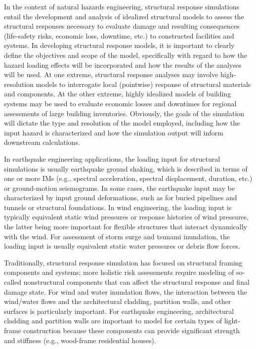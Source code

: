 In the context of natural hazards engineering, structural response simulations entail the development and analysis of idealized structural models to assess the structural responses necessary to evaluate damage and resulting consequences (life-safety risks, economic loss, downtime, etc.) to constructed facilities and systems. In developing structural response models, it is important to clearly define the objectives and scope of the model, specifically with regard to how the hazard loading effects will be incorporated and how the results of the analyses will be used. At one extreme, structural response analyses may involve high-resolution models to interrogate local (pointwise) response of structural materials and components. At the other extreme, highly idealized models of building systems may be used to evaluate economic losses and downtimes for regional assessments of large building inventories. Obviously, the goals of the simulation will dictate the type and resolution of the model employed, including how the input hazard is characterized and how the simulation output will inform downstream calculations.

In earthquake engineering applications, the loading input for structural simulations is usually earthquake ground shaking, which is described in terms of one or more IMs (e.g., spectral acceleration, spectral displacement, duration, etc.) or ground-motion seismograms. In some cases, the earthquake input may be characterized by input ground deformations, such as for buried pipelines and tunnels or structural foundations. In wind engineering, the loading input is typically equivalent static wind pressures or response histories of wind pressures, the latter being more important for flexible structures that interact dynamically with the wind. For assessment of storm surge and tsunami inundation, the loading input is usually equivalent static water pressures or debris flow forces. 

Traditionally, structural response simulation has focused on structural framing components and systems; more holistic risk assessments require modeling of so-called nonstructural components that can affect the structural response and final damage state. For wind and water inundation flows, the interaction between the wind/water flows and the architectural cladding, partition walls, and other surfaces is particularly important. For earthquake engineering, architectural cladding and partition walls are important to model for certain types of light-frame construction because these components can provide significant strength and stiffness (e.g., wood-frame residential houses).

